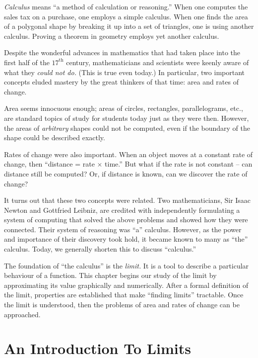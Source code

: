 \textit{Calculus} means ``a method of calculation or reasoning.'' When one computes the sales tax on a purchase, one employs a simple calculus. When one finds the area of a polygonal shape by breaking it up into a set of triangles, one is using another calculus. Proving a theorem in geometry employs yet another calculus.

Despite the wonderful advances in mathematics that had taken place into the first half of the $17^\text{th}$ century, mathematicians and scientists were keenly aware of what they \textit{could not do.} (This is true even today.) In particular, two important concepts eluded mastery by the great thinkers of that time: area and rates of change. 

Area seems innocuous enough; areas of circles, rectangles, parallelograms, etc., are standard topics of study for students today just as they were then. However, the areas of \textit{arbitrary} shapes could not be computed, even if the boundary of the shape could be described exactly. 

Rates of change were also important. When an object moves at a constant rate of change, then ``distance = rate $\times $ time.'' But what if the rate is not constant -- can distance still be computed? Or, if distance is known, can we discover the rate of change?

It turns out that these two concepts were related. Two mathematicians, Sir Isaac Newton and Gottfried Leibniz, are credited with independently formulating a system of computing that solved the above problems and showed how they were connected. Their system of reasoning was ``a'' calculus. However, as the power and importance of their discovery took hold, it became known to many as ``the'' calculus. Today, we generally shorten this to discuss ``calculus.''

The foundation of ``the calculus'' is the \textit{limit.} It is a tool to describe a particular behaviour of a function. This chapter begins our study of the limit by approximating its value graphically and numerically. After a formal definition of the limit, properties are established that make ``finding limits'' tractable. Once the limit is understood, then the problems of area and rates of change can be approached.



\section{An Introduction To Limits}\label{sec:limit_intro}

